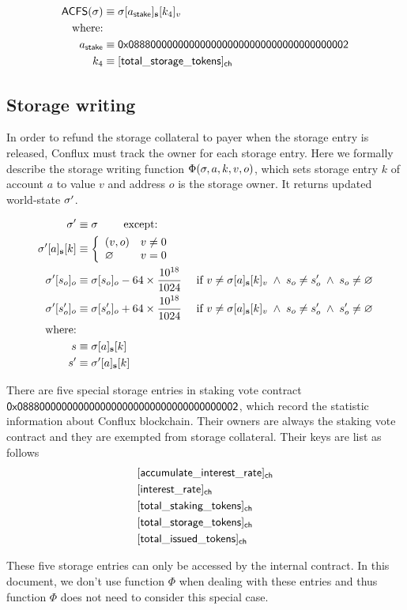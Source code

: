 \begin{align}
	\mathsf{ACFS}(\st) &\eqdef \st[a_{\sf stake}]_{\bf s}[k_4]_v\\
	\mbox{where:} & \\
	a_{\sf stake} &\eqdef \stakingcontract \\ 
	k_4 &\eqdef {\sf [total\char`_storage\char`_tokens]_{\sf ch}} 
\end{align}

\subsection{Storage writing}\label{sec:storage_maintain}

In order to refund the storage collateral to payer when the storage entry is released, Conflux must track the owner for each storage entry. Here we formally describe the storage writing function $\Phi(\mathbf{\sigma},a,k,v,o)$, which sets storage entry $k$ of account $a$ to value $v$ and address $o$ is the storage owner. It returns updated world-state $\mathbf{\sigma}'$. 

\begin{align}
	\mathbf{\sigma}'   &\equiv \mathbf{\sigma} \qquad \mbox{  except:}\\ 
	\mathbf{\sigma}'[a]_{\bf s}[k] &\equiv\left\{
		\begin{array}{ll}
			(v,o) & v\neq 0\\
			\varnothing & v= 0\\
		\end{array}
	\right.\\
	\mathbf{\sigma}'[s_o]_o &\equiv \mathbf{\sigma}[s_o]_o - 64 \times \frac{10^{18}}{1024} \quad \mbox{ if } v\neq \mathbf{\sigma}[a]_{\bf s}[k]_v \;\wedge\; s_o\neq s'_o \;\wedge\; s_o\neq\varnothing \\ 
	\mathbf{\sigma}'[s'_o]_o &\equiv \mathbf{\sigma}[s'_o]_o + 64 \times \frac{10^{18}}{1024} \quad \mbox{ if }v\neq \mathbf{\sigma}[a]_{\bf s}[k]_v \;\wedge\; s_o\neq s'_o \;\wedge\; s'_o\neq\varnothing \\ 
	\text{where:} & \\
	s &\equiv \mathbf{\sigma}[a]_{\bf s}[k] \\
	s' &\equiv \mathbf{\sigma}'[a]_{\bf s}[k] 
\end{align}

There are five special storage entries in staking vote contract ${\sf 0x0888000000000000000000000000000000000002}$, which record the statistic information about Conflux blockchain. Their owners are always the staking vote contract and they are exempted from storage collateral. Their keys are list as follows 
\begin{align}
	& \sf [accumulate\char`_interest\char`_rate]_{\sf ch} \\ 
	& \sf [interest\char`_rate]_{\sf ch} \\
    & \sf [total\char`_staking\char`_tokens]_{\sf ch} \\
    & \sf [total\char`_storage\char`_tokens]_{\sf ch} \\
    & \sf [total\char`_issued\char`_tokens]_{\sf ch} 
\end{align}

These five storage entries can only be accessed by the internal contract. In this document, we don't use function $\Phi$ when dealing with these entries and thus function $\Phi$ does not need to consider this special case. 
